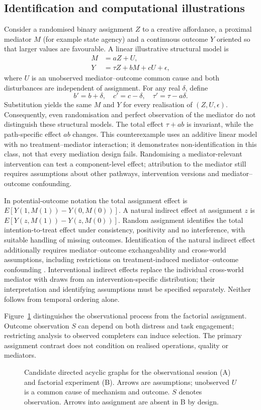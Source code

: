 \subsection{Identification and computational illustrations}
Consider a randomised binary assignment $Z$ to a creative affordance, a proximal mediator $M$ (for example state agency) and a continuous outcome $Y$ oriented so that larger values are favourable. A linear illustrative structural model is
\begin{align}
M &= aZ+U,\\
Y &= \tau Z+bM+cU+\epsilon,
\end{align}
where $U$ is an unobserved mediator--outcome common cause and both disturbances are independent of assignment. For any real $\delta$, define
\[
 b'=b+\delta,\quad c'=c-\delta,\quad \tau'=\tau-a\delta .
\]
Substitution yields the same $M$ and $Y$ for every realisation of $(Z,U,\epsilon)$. Consequently, even randomisation and perfect observation of the mediator do not distinguish these structural models. The total effect $\tau+ab$ is invariant, while the path-specific effect $ab$ changes. This counterexample uses an additive linear model with no treatment--mediator interaction; it demonstrates non-identification in this class, not that every mediation design fails. Randomising a mediator-relevant intervention can test a component-level effect; attribution to the mediator still requires assumptions about other pathways, intervention versions and mediator--outcome confounding.

In potential-outcome notation the total assignment effect is $E[Y(1,M(1))-Y(0,M(0))]$. A natural indirect effect at assignment $z$ is $E[Y(z,M(1))-Y(z,M(0))]$. Random assignment identifies the total intention-to-treat effect under consistency, positivity and no interference, with suitable handling of missing outcomes. Identification of the natural indirect effect additionally requires mediator--outcome exchangeability and cross-world assumptions, including restrictions on treatment-induced mediator--outcome confounding \citep{imai2010}. Interventional indirect effects replace the individual cross-world mediator with draws from an intervention-specific distribution; their interpretation and identifying assumptions must be specified separately. Neither follows from temporal ordering alone.

Figure~\ref{fig:dag} distinguishes the observational process from the factorial assignment. Outcome observation $S$ can depend on both distress and task engagement; restricting analysis to observed completers can induce selection. The primary assignment contrast does not condition on realised operations, quality or mediators.
\begin{figure}[htbp]
\centering

\caption{Candidate directed acyclic graphs for the observational session (A) and factorial experiment (B). Arrows are assumptions; unobserved $U$ is a common cause of mechanism and outcome. $S$ denotes observation. Arrows into assignment are absent in B by design.}
\label{fig:dag}
\end{figure}


